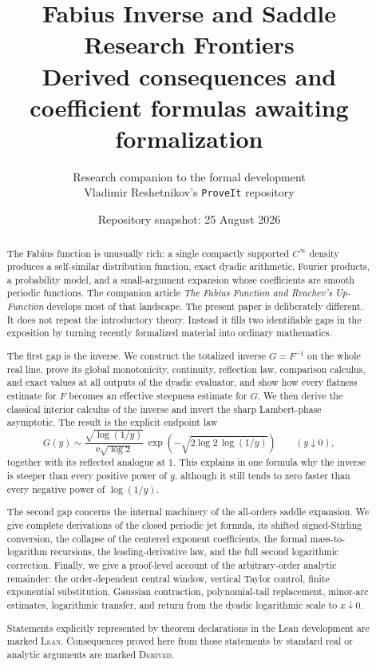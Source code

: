 \documentclass[11pt,oneside]{article}
\title{\bfseries Fabius Inverse and Saddle Research Frontiers\\[0.35em]
\large Derived consequences and coefficient formulas awaiting formalization}
\author{Research companion to the formal development\\
\small Vladimir Reshetnikov's \texttt{ProveIt} repository}
\date{Repository snapshot: 25 August 2026}
\theoremstyle{definition}
\theoremstyle{remark}
\newcommand{\e}{\mathrm e}
\newcommand{\InvF}{G}
\newcommand{\Formalized}{\textsc{Lean}}
\newcommand{\Derived}{\textsc{Derived}}
\begin{document}
\maketitle

\begin{abstract}
The Fabius function is unusually rich: a single compactly supported
$C^\infty$ density produces a self-similar distribution function, exact
dyadic arithmetic, Fourier products, a probability model, and a
small-argument expansion whose coefficients are smooth periodic functions.
The companion article \emph{The Fabius Function and Rvachev's Up-Function}
develops most of that landscape.  The present paper is deliberately
different.  It does not repeat the introductory theory.  Instead it fills
two identifiable gaps in the exposition by turning recently formalized
material into ordinary mathematics.

The first gap is the inverse.  We construct the totalized inverse
$\InvF=F^{-1}$ on the whole real line, prove its global monotonicity,
continuity, reflection law, comparison calculus, and exact values at all
outputs of the dyadic evaluator, and show how every flatness estimate for
$F$ becomes an effective steepness estimate for $\InvF$.  We then derive
the classical interior calculus of the inverse and invert the sharp
Lambert-phase asymptotic.  The result is the explicit endpoint law
\[
 \InvF(y)\sim
 \frac{\sqrt{\log(1/y)}}{\e\sqrt{\log 2}}\,
 \exp\!\left(-\sqrt{2\log 2\,\log(1/y)}\right)
 \qquad (y\downarrow0),
\]
together with its reflected analogue at $1$.  This explains in one formula
why the inverse is steeper than every positive power of $y$, although it
still tends to zero faster than every negative power of $\log(1/y)$.

The second gap concerns the internal machinery of the all-orders saddle
expansion.  We give complete derivations of the closed periodic jet
formula, its shifted signed-Stirling conversion, the collapse of the
centered exponent coefficients, the formal mass-to-logarithm recursions,
the leading-derivative law, and the full second logarithmic correction.
Finally, we give a proof-level account of the arbitrary-order analytic
remainder: the order-dependent central window, vertical Taylor control,
finite exponential substitution, Gaussian contraction, polynomial-tail
replacement, minor-arc estimates, logarithmic transfer, and return from
the dyadic logarithmic scale to $x\downarrow0$.

Statements explicitly represented by theorem declarations in the Lean
development are marked \Formalized.  Consequences proved here from those
statements by standard real or analytic arguments are marked \Derived.
\end{abstract}
\end{document}
